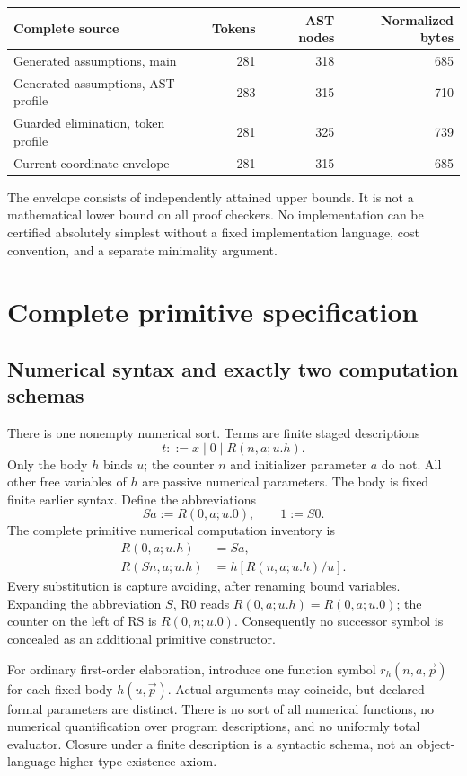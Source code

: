 \documentclass[11pt,letterpaper]{article}
\theoremstyle{definition}\newtheorem{definition}[theorem]{Definition}
\theoremstyle{remark}\newtheorem{remark}[theorem]{Remark}
\begin{document}
\begin{center}
\begin{tabular}{lrrr}
\toprule
Complete source & Tokens & AST nodes & Normalized bytes\\
\midrule
Generated assumptions, main &281&318&685\\
Generated assumptions, AST profile &283&315&710\\
Guarded elimination, token profile &281&325&739\\
\midrule
Current coordinate envelope &281&315&685\\
\bottomrule
\end{tabular}
\end{center}
The envelope consists of independently attained upper bounds. It is not
a mathematical lower bound on all proof checkers. No implementation can
be certified absolutely simplest without a fixed implementation language,
cost convention, and a separate minimality argument.


\section{Complete primitive specification}\label{sec:spec}

\subsection{Numerical syntax and exactly two computation schemas}

There is one nonempty numerical sort. Terms are finite staged descriptions
\[
                  t::=x\mid0\mid R(n,a;u.h).
\]
Only the body $h$ binds $u$; the counter $n$ and initializer parameter $a$
do not. All other free variables of $h$ are passive numerical parameters.
The body is fixed finite earlier syntax. Define the abbreviations
\[
                   Sa:=R(0,a;u.0),\qquad 1:=S0.
\]
The complete primitive numerical computation inventory is
\begin{align}
 R(0,a;u.h)&=Sa,\tag{R0}\label{eq:r0}\\
 R(Sn,a;u.h)&=h[R(n,a;u.h)/u].\tag{RS}\label{eq:rs}
\end{align}
Every substitution is capture avoiding, after renaming bound variables.
Expanding the abbreviation $S$, R0 reads
$R(0,a;u.h)=R(0,a;u.0)$; the counter on the left of RS is
$R(0,n;u.0)$. Consequently no successor symbol is concealed as an
additional primitive constructor.

For ordinary first-order elaboration, introduce one function symbol
$r_h(n,a,\vec p)$ for each fixed body $h(u,\vec p)$. Actual arguments
may coincide, but declared formal parameters are distinct. There is no
sort of all numerical functions, no numerical quantification over program
descriptions, and no uniformly total evaluator. Closure under a finite
description is a syntactic schema, not an object-language higher-type
existence axiom.
\end{document}
